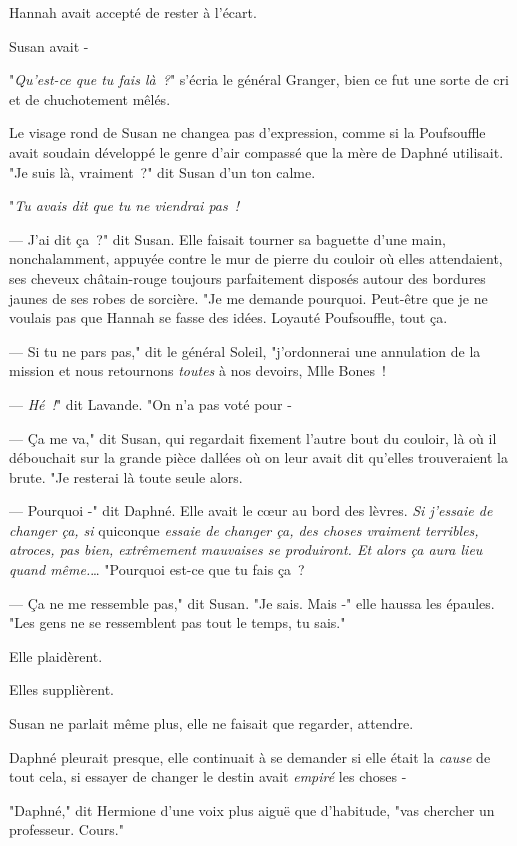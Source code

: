 Hannah avait accepté de rester à l'écart.

Susan avait -

\later

"\emph{Qu'est-ce que tu fais là~?}" s'écria le général Granger, bien ce fut une sorte de cri et de chuchotement mêlés.

Le visage rond de Susan ne changea pas d'expression, comme si la Poufsouffle avait soudain développé le genre d'air compassé que la mère de Daphné utilisait. "Je suis là, vraiment~?" dit Susan d'un ton calme.

"\emph{Tu avais dit que tu ne viendrai pas~!}

--- J'ai dit ça~?" dit Susan. Elle faisait tourner sa baguette d'une main, nonchalamment, appuyée contre le mur de pierre du couloir où elles attendaient, ses cheveux châtain-rouge toujours parfaitement disposés autour des bordures jaunes de ses robes de sorcière. "Je me demande pourquoi. Peut-être que je ne voulais pas que Hannah se fasse des idées. Loyauté Poufsouffle, tout ça.

--- Si tu ne pars pas," dit le général Soleil, "j'ordonnerai une annulation de la mission et nous retournons \emph{toutes} à nos devoirs, Mlle Bones~!

--- \emph{Hé~!}" dit Lavande. "On n'a pas voté pour -

--- Ça me va," dit Susan, qui regardait fixement l'autre bout du couloir, là où il débouchait sur la grande pièce dallées où on leur avait dit qu'elles trouveraient la brute. "Je resterai là toute seule alors.

--- Pourquoi -" dit Daphné. Elle avait le cœur au bord des lèvres. \emph{Si j'essaie de changer ça, si} quiconque \emph{essaie de changer ça, des choses vraiment terribles, atroces, pas bien, extrêmement mauvaises se produiront. Et alors ça aura lieu quand même.}… "Pourquoi est-ce que tu fais ça~?

--- Ça ne me ressemble pas," dit Susan. "Je sais. Mais -" elle haussa les épaules. "Les gens ne se ressemblent pas tout le temps, tu sais."

Elle plaidèrent.

Elles supplièrent.

Susan ne parlait même plus, elle ne faisait que regarder, attendre.

Daphné pleurait presque, elle continuait à se demander si elle était la \emph{cause} de tout cela, si essayer de changer le destin avait \emph{empiré} les choses -

"Daphné," dit Hermione d'une voix plus aiguë que d'habitude, "vas chercher un professeur. Cours."

